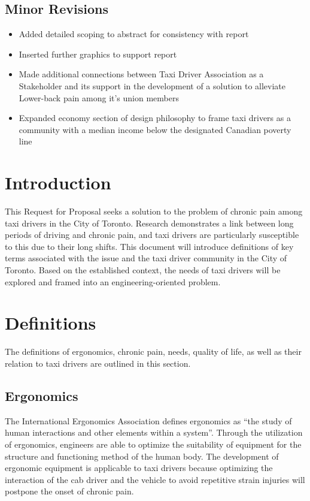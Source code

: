 \documentclass[11pt]{article}
\begin{document}
\subsection{Minor Revisions}
\label{sec:minor revisions} 
\begin{itemize}
\item Added detailed scoping to abstract for consistency with report 
\item Inserted further graphics to support report
\item Made additional connections between Taxi Driver Association as a
Stakeholder and its support in the development of a solution to alleviate
Lower-back pain among it’s union members 
\item Expanded economy section of design philosophy to frame taxi drivers as a  community with a median income below the designated Canadian poverty line 
\end{itemize}
\section{Introduction}
\label{sec:intro}
This Request for Proposal seeks a solution to the problem of chronic
pain among taxi drivers in the City of Toronto. Research demonstrates a
link between long periods of driving and chronic pain\cite{KneePain,
Okunribido2008}, and taxi drivers are particularly susceptible to this
due to their long shifts\cite{thestar2012, KneePain}. This document will introduce
definitions of key terms associated with the issue and the taxi driver community
in the City of Toronto. Based on the established context, the needs of taxi drivers
will be explored and framed into an engineering-oriented problem. 

\section{Definitions}
\label{sec:defs}
The definitions of ergonomics, chronic pain, needs, quality of life, as
well as their relation to taxi drivers are outlined in this section.

\subsection{Ergonomics}
\label{sec:ergonomics}

The International Ergonomics Association defines ergonomics as “the
study of human interactions and other elements within a system”\cite{ergo}. 
Through the utilization of ergonomics, engineers are able to optimize the suitability
of equipment for the structure and functioning method of the human
body. The development of ergonomic equipment is applicable to
taxi drivers because optimizing the interaction of the cab driver
and the vehicle to avoid repetitive strain injuries will postpone
the onset of chronic pain. 
\end{document}
